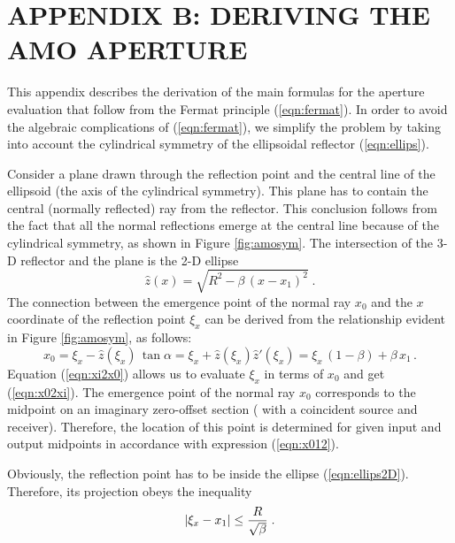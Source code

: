 \section{APPENDIX B: DERIVING THE AMO APERTURE}

This appendix describes the derivation of the main formulas for the
aperture evaluation that follow from the Fermat principle (\ref{eqn:fermat}).
In order to avoid the algebraic
complications  of (\ref{eqn:fermat}), we simplify the
problem by taking into account the cylindrical symmetry of the ellipsoidal
reflector (\ref{eqn:ellips}).
\par
Consider a plane drawn through the reflection point and the central line
of the ellipsoid (the axis of the cylindrical symmetry). This plane
has to contain the central (normally reflected) ray from the
reflector. This conclusion follows from the fact that all the normal
reflections emerge at the central line because of the cylindrical
symmetry, as shown in Figure \ref{fig:amosym}. The intersection of the 3-D
reflector and the plane is the 
2-D ellipse
\begin{equation}
\hat{z}(x)=\sqrt{R^2-\beta\,\left(x-x_1\right)^2}\;.
\label{eqn:ellips2D}
\end{equation}
The connection between the emergence point of the normal ray $x_0$ and
the $x$ coordinate of the reflection point $\xi_x$ can be derived from the
relationship evident in Figure \ref{fig:amosym}, as follows:
\begin{equation}
x_0=\xi_x-\hat{z}\left(\xi_x\right)\,\tan{\alpha}=
\xi_x+\hat{z}\left(\xi_x\right)\hat{z}'\left(\xi_x\right)=\xi_x\,(1-\beta)+
\beta\,x_1\,.
\label{eqn:xi2x0}
\end{equation}
Equation (\ref{eqn:xi2x0}) allows us to evaluate $\xi_x$ in terms of
$x_0$ and get (\ref{eqn:x02xi}). The emergence point of the normal ray $x_0$
corresponds to the 
midpoint on an imaginary zero-offset section ( with a coincident
source and receiver). Therefore, the location of this point is
determined for given input 
and output midpoints in accordance with expression (\ref{eqn:x012}).
\par
Obviously, the reflection point has to be inside the ellipse
(\ref{eqn:ellips2D}). Therefore, its projection obeys the inequality
\begin{equation}
\left|\xi_x-x_1\right| \leq {R\over \sqrt{\beta}}\;.
\label{eqn:xileq}
\end{equation} 
